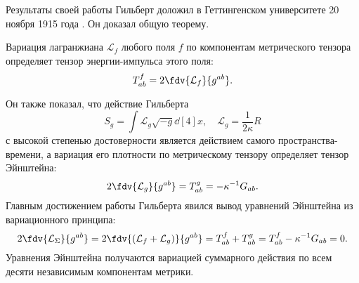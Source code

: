 \documentclass[\docroot/reports/draft/report.tex]{subfiles}
\begin{document}
    Результаты своей работы Гильберт доложил в Геттингенском университете 20 ноября 1915 года \cite{gilbert_phys}. Он доказал общую теорему.
    \begin{theorem*}
        Вариация лагранжиана $\mathcal{L}_f$ любого поля $f$ по компонентам метрического тензора определяет тензор энергии-импульса этого поля:
        \begin{equation*}
            T^f_{ab} = 2 \fdv{\mathcal{L}_f}{g^{ab}} .
        \end{equation*}
    \end{theorem*}
    Он также показал, что действие Гильберта
    \begin{equation*}
        S_g = \int \mathcal{L}_g \sqrt{-g} \dd[4]{x} , \quad \mathcal{L}_g = \frac{1}{2 \kappa} R
    \end{equation*}
    с высокой степенью достоверности является действием самого пространства-времени, а вариация его плотности по метрическому тензору определяет тензор Эйнштейна:
    \begin{equation*}
        2\fdv{\mathcal{L}_g}{g^{ab}} = T^g_{ab} = - \kappa^{-1} G_{ab} .
    \end{equation*}
    Главным достижением работы Гильберта явился вывод уравнений Эйнштейна из вариационного принципа:
    \begin{equation*}
        2 \fdv{\mathcal{L}_\Sigma}{g^{ab}} =
        2 \fdv{(\mathcal{L}_f + \mathcal{L}_g)}{g^{ab}} =
        T^f_{ab} + T^g_{ab} =
        T^f_{ab} - \kappa^{-1} G_{ab} =
        0 .
    \end{equation*}
    Уравнения Эйнштейна получаются вариацией суммарного действия по всем десяти независимым компонентам метрики.

\end{document}
